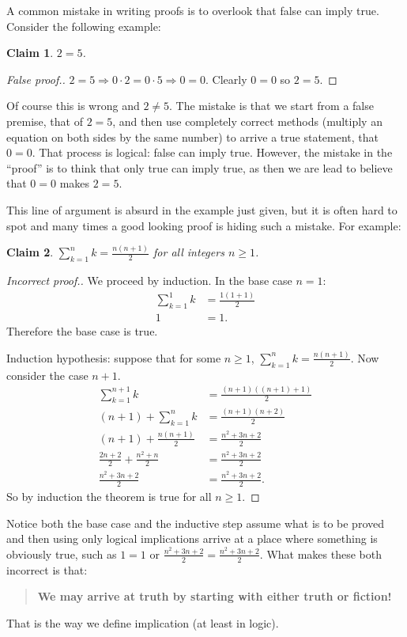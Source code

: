\documentclass[12pt]{article}
\newtheorem{claim}{Claim}
\begin{document}
A common mistake in writing proofs is to overlook that false can imply true.
Consider the following example:

\begin{claim}
$2=5$.
\end{claim}
\begin{proof}[False proof.]
$2=5 \Rightarrow 0\cdot 2=0\cdot 5 \Rightarrow 0=0$.  Clearly $0=0$ so $2=5$.
\end{proof}

Of course this is wrong and $2\neq 5$.  The mistake is that we start from a false premise,
that of $2=5$, and then use completely correct methods (multiply an equation on both sides by
the same number) to arrive a true statement, that $0=0$.
That process is logical: false can imply true.  However, the mistake in the ``proof'' is to 
think that only true can imply true, as then we are lead to believe that $0=0$ makes $2=5$.

This line of argument is absurd in the example just given, but it is often hard to spot and
many times a good looking proof is hiding such a mistake.  For example:

\begin{claim}
$\displaystyle \sum_{k=1}^n k = \frac{n(n+1)}{2}$ for all integers $n\geq 1$.
\end{claim}
\begin{proof}[Incorrect proof.]
We proceed by induction.  In the base case $n=1$:
\begin{align*}
   \sum_{k=1}^1 k & =\frac{1(1+1)}{2}\\
   1 & = 1.
\end{align*}
Therefore the base case is true.

Induction hypothesis: suppose that for some $n\geq 1$,
$\displaystyle \sum_{k=1}^n k =\frac{n(n+1)}{2}$.
Now consider the case $n+1$.
\begin{align*}
  \sum_{k=1}^{n+1} k & = \frac{(n+1)((n+1)+1)}{2}\\
  (n+1) + \sum_{k=1}^n k & = \frac{(n+1)(n+2)}{2}\\
  (n+1) + \frac{n(n+1)}{2} & = \frac{n^2+3n+2}{2}\\
  \frac{2n+2}{2} +\frac{n^2+n}{2} & = \frac{n^2+3n+2}{2}\\
  \frac{n^2+3n+2}{2} & = \frac{n^2+3n +2}{2}.
\end{align*}
So by induction the theorem is true for all $n\geq 1$.
\end{proof}

Notice both the base case and the inductive step assume what is to be proved and then
using only logical implications arrive at a place where something is obviously true,
such as $1=1$ or $\frac{n^2+3n+2}{2}=\frac{n^2+3n+2}{2}$.  What makes these both incorrect
is that:
\begin{quote}
  \textbf{We may arrive at truth by starting with either truth or fiction!}
\end{quote}
That is the way we define implication (at least in logic).
\end{document}
